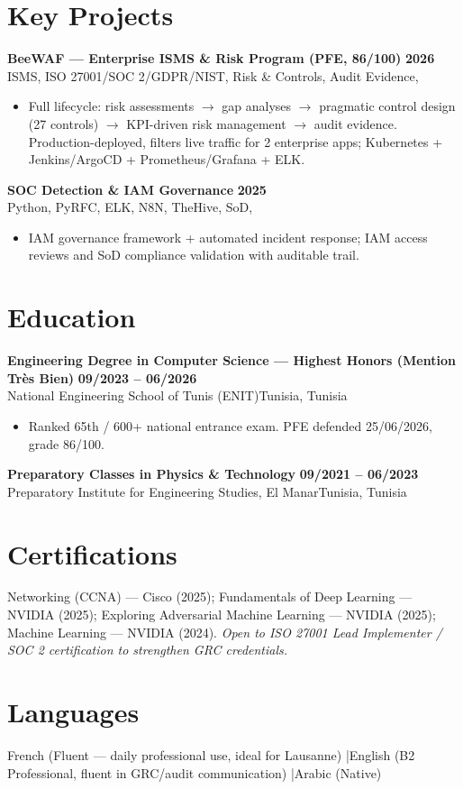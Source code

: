 \documentclass[a4paper,9pt]{article}
\newcommand{\cventry}[4]{\textbf{#1} \hfill \textbf{#4}\\[0.3pt]#2{\ifx\relax#3\relax\else, #3\fi}\par\vspace{0.6pt}}
\begin{document}
\section{Key Projects}
\cventry{BeeWAF --- Enterprise ISMS \& Risk Program (PFE, 86/100)}{ISMS, ISO 27001/SOC 2/GDPR/NIST, Risk \& Controls, Audit Evidence}{}{2026}
\begin{itemize}
  \item Full lifecycle: risk assessments $\to$ gap analyses $\to$ pragmatic control design (27 controls) $\to$ KPI-driven risk management $\to$ audit evidence. Production-deployed, filters live traffic for 2 enterprise apps; Kubernetes + Jenkins/ArgoCD + Prometheus/Grafana + ELK.
\end{itemize}
\cventry{SOC Detection \& IAM Governance}{Python, PyRFC, ELK, N8N, TheHive, SoD}{}{2025}
\begin{itemize}
  \item IAM governance framework + automated incident response; IAM access reviews and SoD compliance validation with auditable trail.
\end{itemize}

\section{Education}
\cventry{Engineering Degree in Computer Science --- Highest Honors (Mention Très Bien)}{National Engineering School of Tunis (ENIT)}{Tunisia}{09/2023 -- 06/2026}
\begin{itemize}
  \item Ranked 65th / 600+ national entrance exam. PFE defended 25/06/2026, grade 86/100.
\end{itemize}
\cventry{Preparatory Classes in Physics \& Technology}{Preparatory Institute for Engineering Studies, El Manar}{Tunisia}{09/2021 -- 06/2023}

\section{Certifications}
Networking (CCNA) --- Cisco (2025); Fundamentals of Deep Learning --- NVIDIA (2025); Exploring Adversarial Machine Learning --- NVIDIA (2025); Machine Learning --- NVIDIA (2024). \textit{Open to ISO 27001 Lead Implementer / SOC 2 certification to strengthen GRC credentials.}

\section{Languages}
French (Fluent — daily professional use, ideal for Lausanne) \quad|\quad English (B2 Professional, fluent in GRC/audit communication) \quad|\quad Arabic (Native)
\end{document}
